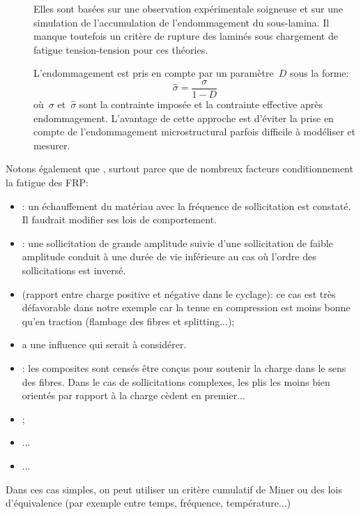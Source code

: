 \begin{description}
  \item[] Elles sont basées
     sur une observation expérimentale soigneuse et sur une
     simulation de l'accumulation de l'endommagement du
     sous-lamina.
     Il manque toutefois un critère de rupture des laminés sous
     chargement de fatigue tension-tension pour ces théories.
  \item[] L'endommagement
     est pris en compte par un paramètre~$D$ sous la forme:
     \begin{equation}
      \widehat{\sigma}=\dfrac{\sigma}{1-D}
     \end{equation}
     où~$\sigma$ et~$\widehat{\sigma}$ sont la contrainte
     imposée et la contrainte effective après endommagement.
     L'avantage de cette approche est d'éviter la prise en
     compte de l'endommagement microstructural parfois difficile
     à modéliser et mesurer.
\end{description}
\medskipvm
Notons également que , surtout parce que de nombreux facteurs conditionnement la fatigue des FRP:
\begin{itemize}
	\item {}: un échauffement du matériau avec la fréquence de sollicitation est
		constaté. Il faudrait modifier ses lois de comportement.
	\item {}: une sollicitation de grande amplitude suivie d'une sollicitation de faible amplitude
		conduit à une durée de vie inférieure au cas où l'ordre des sollicitations est
		inversé.
	\item {} (rapport entre charge positive et négative dans le cyclage): ce cas est très
		défavorable dans notre exemple car la tenue en compression est moins bonne qu'en
		traction (flambage des fibres et splitting...);
	\item {} a une influence qui serait à considérer.
	\item {}: les composites sont censés être conçus pour soutenir la
		charge dans le sens des fibres. Dans le cas de sollicitations complexes, les plis les
		moins bien orientés par rapport à la charge cèdent en premier...
	\item {};
	\item {}...
	\item ...
\end{itemize}
\medskipvm
Dans ces cas simples, on peut utiliser un critère cumulatif de Miner ou des lois d'équivalence (par
exemple entre temps, fréquence, température...)


